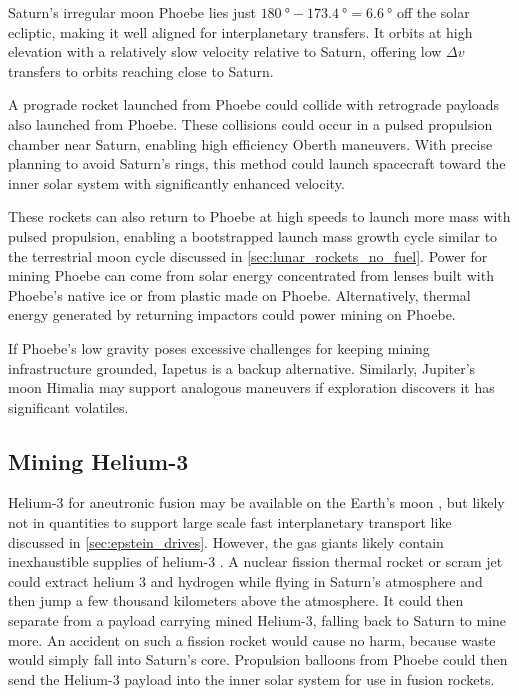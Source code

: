\documentclass{article}
\begin{document}
Saturn’s irregular moon Phoebe lies just $\SI{180}{\degree} - \SI{173.4}{\degree} = \SI{6.6}{\degree}$ off the solar ecliptic, making it well aligned for interplanetary transfers. It orbits at high elevation with a relatively slow velocity relative to Saturn, offering low $\Delta v$ transfers to orbits reaching close to Saturn.

A prograde rocket launched from Phoebe could collide with retrograde payloads also launched from Phoebe. These collisions could occur in a pulsed propulsion chamber near Saturn, enabling high efficiency Oberth maneuvers. With precise planning to avoid Saturn’s rings, this method could launch spacecraft toward the inner solar system with significantly enhanced velocity.

These rockets can also return to Phoebe at high speeds to launch more mass with pulsed propulsion, enabling a bootstrapped launch mass growth cycle similar to the terrestrial moon cycle discussed in \autoref{sec:lunar_rockets_no_fuel}. Power for mining Phoebe can come from solar energy concentrated from lenses built with Phoebe’s native ice or from plastic made on Phoebe.  Alternatively, thermal energy generated by returning impactors could power mining on Phoebe.

If Phoebe’s low gravity poses excessive challenges for keeping mining infrastructure grounded, Iapetus is a backup alternative. Similarly, Jupiter’s moon Himalia may support analogous maneuvers if exploration discovers  it has significant volatiles.  

\subsection{Mining Helium-3}
Helium-3 for aneutronic fusion may be available on the Earth's moon \cite{esa_helium3_mining}, but likely not in quantities to support large scale fast interplanetary transport like discussed in \autoref{sec:epstein_drives}.   However, the gas giants likely contain inexhaustible supplies of helium-3 \cite{palaszewski2005atmospheric}.   A nuclear fission thermal rocket or scram jet could extract helium 3 and hydrogen while flying in Saturn's atmosphere and then jump a few thousand kilometers above the atmosphere.  It could then separate from a payload carrying mined Helium-3, falling back to Saturn to mine more.  An accident on such a fission rocket would cause no harm, because waste would simply fall into Saturn's core. Propulsion balloons from Phoebe could then send the Helium-3 payload into the inner solar system for use in fusion rockets.  
\end{document}
